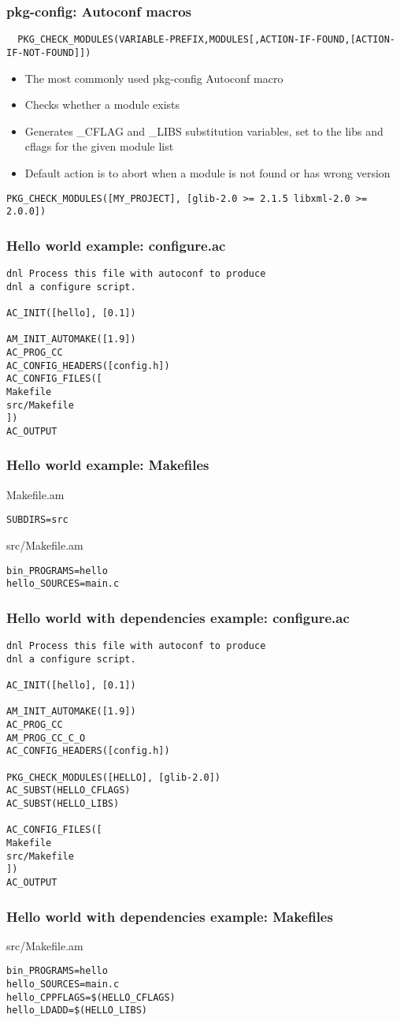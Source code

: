 \begin{frame}[fragile]
  \frametitle{pkg-config: Autoconf macros}
{\tiny
\begin{verbatim}
  PKG_CHECK_MODULES(VARIABLE-PREFIX,MODULES[,ACTION-IF-FOUND,[ACTION-IF-NOT-FOUND]])
\end{verbatim}
}
\begin{itemize}
\item The most commonly used pkg-config Autoconf macro
\item Checks whether a module exists
\item Generates \_CFLAG and \_LIBS substitution variables, set to the
  libs and cflags for the given module list
\item Default action is to abort when a module is not found or has
  wrong version
\end{itemize}
{\tiny
\begin{verbatim}
PKG_CHECK_MODULES([MY_PROJECT], [glib-2.0 >= 2.1.5 libxml-2.0 >= 2.0.0])
\end{verbatim}
}
\end{frame}

\begin{frame}[fragile]
  \frametitle{Hello world example: configure.ac}
\begin{verbatim}
dnl Process this file with autoconf to produce 
dnl a configure script.

AC_INIT([hello], [0.1])

AM_INIT_AUTOMAKE([1.9])
AC_PROG_CC
AC_CONFIG_HEADERS([config.h])
AC_CONFIG_FILES([
Makefile
src/Makefile
])
AC_OUTPUT
\end{verbatim}
\end{frame}

\begin{frame}[fragile]
  \frametitle{Hello world example: Makefiles}
  Makefile.am
\begin{verbatim}
SUBDIRS=src
\end{verbatim}
  src/Makefile.am
\begin{verbatim}
bin_PROGRAMS=hello
hello_SOURCES=main.c
\end{verbatim}

\end{frame}

\begin{frame}[fragile]
  \frametitle{Hello world with dependencies example: configure.ac}
{\scriptsize
\begin{verbatim}
dnl Process this file with autoconf to produce 
dnl a configure script.

AC_INIT([hello], [0.1])

AM_INIT_AUTOMAKE([1.9])
AC_PROG_CC
AM_PROG_CC_C_O
AC_CONFIG_HEADERS([config.h])

PKG_CHECK_MODULES([HELLO], [glib-2.0])
AC_SUBST(HELLO_CFLAGS)
AC_SUBST(HELLO_LIBS)

AC_CONFIG_FILES([
Makefile
src/Makefile
])
AC_OUTPUT
\end{verbatim}
}
\end{frame}

\begin{frame}[fragile]
  \frametitle{Hello world with dependencies example: Makefiles}

  src/Makefile.am
\begin{verbatim}
bin_PROGRAMS=hello
hello_SOURCES=main.c
hello_CPPFLAGS=$(HELLO_CFLAGS)
hello_LDADD=$(HELLO_LIBS)
\end{verbatim}
\end{frame}


